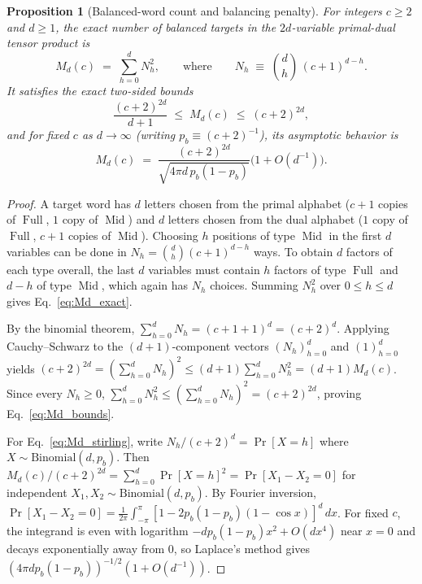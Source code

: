 \documentclass[11pt,a4paper]{article}
\theoremstyle{plain}
\newtheorem{proposition}[theorem]{Proposition}
\theoremstyle{definition}
\theoremstyle{remark}
\DeclareMathOperator{\Full}{Full}
\DeclareMathOperator{\Mid}{Mid}
\begin{document}
\begin{proposition}[Balanced-word count and balancing penalty]
\label{prop:balanced_words}
For integers $c \ge 2$ and $d \ge 1$, the exact number of balanced targets in the $2d$-variable primal-dual tensor product is
\begin{equation}
    M_d(c) \;=\; \sum_{h=0}^d N_h^2 , \qquad\text{where}\qquad N_h \;\equiv\; \binom{d}{h}\,(c + 1)^{d - h} .
    \label{eq:Md_exact}
\end{equation}
It satisfies the exact two-sided bounds
\begin{equation}
    \frac{(c + 2)^{2d}}{d + 1} \;\le\; M_d(c) \;\le\; (c + 2)^{2d} ,
    \label{eq:Md_bounds}
\end{equation}
and for fixed $c$ as $d \to \infty$ (writing $p_b \equiv (c + 2)^{-1}$), its asymptotic behavior is
\begin{equation}
    M_d(c) \;=\; \frac{(c + 2)^{2d}}{\sqrt{4\pi d \, p_b (1 - p_b)}}\bigl(1 + O(d^{-1})\bigr) .
    \label{eq:Md_stirling}
\end{equation}
\end{proposition}
\begin{proof}
A target word has $d$ letters chosen from the primal alphabet ($c + 1$ copies of $\Full$, $1$ copy of $\Mid$) and $d$ letters chosen from the dual alphabet ($1$ copy of $\Full$, $c + 1$ copies of $\Mid$). Choosing $h$ positions of type $\Mid$ in the first $d$ variables can be done in $N_h = \binom{d}{h}(c + 1)^{d-h}$ ways. To obtain $d$ factors of each type overall, the last $d$ variables must contain $h$ factors of type $\Full$ and $d - h$ of type $\Mid$, which again has $N_h$ choices. Summing $N_h^2$ over $0 \le h \le d$ gives Eq.~\eqref{eq:Md_exact}.

By the binomial theorem, $\sum_{h=0}^d N_h = (c + 1 + 1)^d = (c + 2)^d$. Applying Cauchy--Schwarz to the $(d + 1)$-component vectors $(N_h)_{h=0}^d$ and $(1)_{h=0}^d$ yields $(c + 2)^{2d} = (\sum_{h=0}^d N_h)^2 \le (d + 1)\sum_{h=0}^d N_h^2 = (d + 1)M_d(c)$. Since every $N_h \ge 0$, $\sum_{h=0}^d N_h^2 \le (\sum_{h=0}^d N_h)^2 = (c + 2)^{2d}$, proving Eq.~\eqref{eq:Md_bounds}.

For Eq.~\eqref{eq:Md_stirling}, write $N_h / (c + 2)^d = \Pr[X = h]$ where $X \sim \mathrm{Binomial}(d, p_b)$. Then $M_d(c)/(c + 2)^{2d} = \sum_{h=0}^d \Pr[X = h]^2 = \Pr[X_1 - X_2 = 0]$ for independent $X_1, X_2 \sim \mathrm{Binomial}(d, p_b)$. By Fourier inversion, $\Pr[X_1 - X_2 = 0] = \frac{1}{2\pi}\int_{-\pi}^{\pi} [1 - 2 p_b(1 - p_b)(1 - \cos x)]^d \, dx$. For fixed $c$, the integrand is even with logarithm $-d p_b(1 - p_b) x^2 + O(d x^4)$ near $x = 0$ and decays exponentially away from $0$, so Laplace's method gives $(4\pi d p_b(1 - p_b))^{-1/2}(1 + O(d^{-1}))$.
\end{proof}
\end{document}
